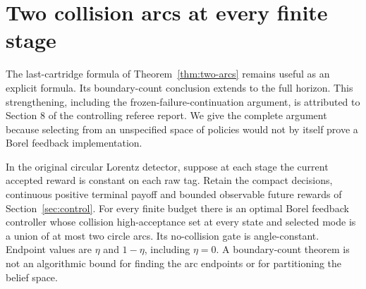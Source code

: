 \section{Two collision arcs at every finite stage}\label{sec:all-stage-arcs}
The last-cartridge formula of Theorem~\ref{thm:two-arcs} remains useful as
an explicit formula. Its boundary-count conclusion extends to the full
horizon. This strengthening, including the frozen-failure-continuation
argument, is attributed to Section 8 of the controlling referee report.
We give the complete argument because selecting from an unspecified space
of policies would not by itself prove a Borel feedback implementation.

\begin{theorem}\label{thm:all-stage-arcs}
In the original circular Lorentz detector, suppose at each stage the current
accepted reward is constant on each raw tag. Retain the compact decisions,
continuous positive terminal payoff and bounded observable future rewards
of Section~\ref{sec:control}. For every finite budget there is an optimal
Borel feedback controller whose collision high-acceptance set at every
state and selected mode is a union of at most two circle arcs. Its
no-collision gate is angle-constant. Endpoint values are $\eta$ and
$1-\eta$, including $\eta=0$. A boundary-count theorem is not an algorithmic
bound for finding the arc endpoints or for partitioning the belief space.
\end{theorem}
